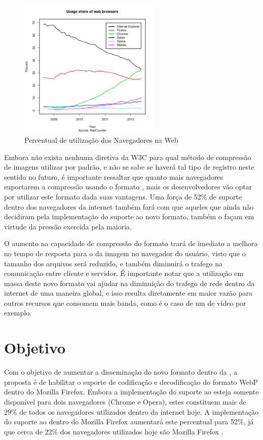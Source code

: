 \documentclass[espaco=simples,appendix=Name]{abnt}
\begin{document}
\begin{description}
\begin{figure}[h]
  \centering
    \includegraphics[width=0.6\textwidth]{BrowserCounter.png}
  \caption{Percentual de utilização dos Navegadores na Web \protect\cite{BrowserStats}}
\end{figure}

Embora não exista nenhuma diretiva da W3C para qual método de compressão de imagens utilizar por padrão, e não se sabe se haverá tal tipo de registro neste sentido no futuro, é importante ressaltar que quanto mais navegadores suportarem a compressão usando o formato , mais os desenvolvedores vão optar por utilizar este formato dada suas vantagens. Uma força de 52\% de suporte dentro dos navegadores da internet também fará com que aqueles que ainda não decidiram pela implementação do suporte ao novo formato, também o façam em virtude da pressão exercida pela maioria.

O aumento na capacidade de compressão do formato  trará de imediato a melhora no tempo de resposta para o  da imagem no navegador do usuário, visto que o tamanho dos arquivos será reduzido, e também diminuirá o trafego na comunicação entre cliente e servidor. É importante notar que a utilização em massa deste novo formato vai ajudar na diminuição do trafego de rede dentro da internet de uma maneira global, e isso resulta diretamente em maior vazão para outros recursos que consomem mais banda, como é o caso de um  de vídeo por exemplo.

\section{Objetivo}

\item \noindent
Com o objetivo de aumentar a disseminação do novo formato dentro da , a proposta é de habilitar o suporte de codificação e decodificação do formato WebP dentro do Mozilla Firefox. Embora a implementação do suporte ao  esteja somente disponível para dois navegadores (Chrome e Opera), estes constituem mais de 29\% de todos os navegadores utilizados dentro da internet hoje. A implementação do suporte ao  dentro do Mozilla Firefox aumentará este percentual para 52\%, já que cerca de 22\% dos navegadores utilizados hoje são Mozilla Firefox \cite{BrowserStats}.


\end{description}
\end{document}
